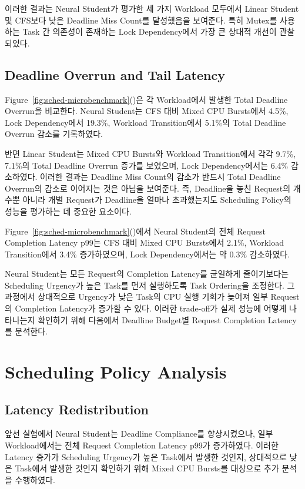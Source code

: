

이러한 결과는 Neural Student가 평가한 세 가지 Workload 모두에서 Linear Student 및 CFS보다 낮은 Deadline Miss Count를 달성했음을 보여준다. 
특히 Mutex를 사용하는 Task 간 의존성이 존재하는 Lock Dependency에서 가장 큰 상대적 개선이 관찰되었다.

\subsection{Deadline Overrun and Tail Latency}
\label{sec:eval-deadline-overrun-and-tail-latency}
Figure~\ref{fig:sched-microbenchmark}()은 각 Workload에서 발생한 Total Deadline Overrun을 비교한다. 
Neural Student는 CFS 대비 Mixed CPU Bursts에서 4.5\%, Lock Dependency에서 19.3\%, Workload Transition에서 5.1\%의 Total Deadline Overrun 감소를 기록하였다.

반면 Linear Student는 Mixed CPU Bursts와 Workload Transition에서 각각 9.7\%, 7.1\%의 Total Deadline Overrun 증가를 보였으며, Lock Dependency에서는 6.4\% 감소하였다. 
이러한 결과는 Deadline Miss Count의 감소가 반드시 Total Deadline Overrun의 감소로 이어지는 것은 아님을 보여준다.
즉, Deadline을 놓친 Request의 개수뿐 아니라 개별 Request가 Deadline을 얼마나 초과했는지도 Scheduling Policy의 성능을 평가하는 데 중요한 요소이다.

Figure~\ref{fig:sched-microbenchmark}()에서 Neural Student의 전체 Request Completion Latency p99는 CFS 대비 Mixed CPU Bursts에서 2.1\%, Workload Transition에서 3.4\% 증가하였으며, Lock Dependency에서는 약 0.3\% 감소하였다. 

Neural Student는 모든 Request의 Completion Latency를 균일하게 줄이기보다는 Scheduling Urgency가 높은 Task를 먼저 실행하도록 Task Ordering을 조정한다. 
그 과정에서 상대적으로 Urgency가 낮은 Task의 CPU 실행 기회가 늦어져 일부 Request의 Completion Latency가 증가할 수 있다. 
이러한 trade-off가 실제 성능에 어떻게 나타나는지 확인하기 위해 다음에서 Deadline Budget별 Request Completion Latency를 분석한다.

\section{Scheduling Policy Analysis}
\label{sec:eval-scheduling-policy-analysis}

\subsection{Latency Redistribution}
\label{sec:eval-latency-redistribution}
앞선 실험에서 Neural Student는 Deadline Compliance를 향상시켰으나,
일부 Workload에서는 전체 Request Completion Latency p99가 증가하였다.
이러한 Latency 증가가 Scheduling Urgency가 높은 Task에서 발생한 것인지,
상대적으로 낮은 Task에서 발생한 것인지 확인하기 위해
Mixed CPU Bursts를 대상으로 추가 분석을 수행하였다.

